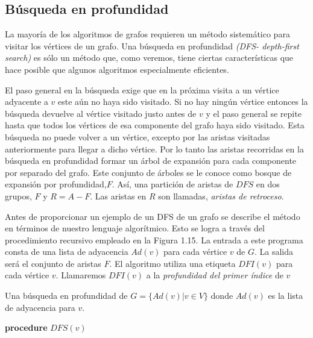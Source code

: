 \documentclass[10pt,a5paper]{book}
\begin{document}
\subsection{Búsqueda en profundidad}
La mayoría de los algoritmos de grafos requieren un método sistemático para visitar los vértices de un grafo. Una búsqueda en profundidad \emph{(DFS- depth-first search)} es sólo un método que, como veremos, tiene ciertas características que hace posible que algunos algoritmos especialmente eficientes.

El paso general en la búsqueda exige que en la próxima visita a un vértice adyacente a $v$ este aún no haya sido visitado. Si no hay ningún vértice entonces la búsqueda devuelve al vértice visitado justo antes de $v$ y el paso general se repite hasta que todos los vértices de esa componente del grafo haya sido visitado. Esta búsqueda no puede volver a un vértice, excepto por las aristas visitadas anteriormente para llegar a dicho vértice. Por lo tanto las aristas recorridas en la búsqueda en profundidad formar un árbol de expansión para cada componente por separado del grafo. Este conjunto de árboles se le conoce como bosque de expansión por profundidad,$F$. Así, una partición de aristas de $DFS$ en dos grupos, $F$ y $R = A - F$. Las aristas en $R$ son llamadas, \emph{aristas de retroceso}.

Antes de proporcionar un ejemplo de un DFS de un grafo se describe el método en términos de nuestro lenguaje algorítmico. Esto se logra a través del procedimiento recursivo empleado en la Figura 1.15. La entrada a este programa consta de una lista de adyacencia $Ad(v)$ para cada vértice $v$ de $G$. La salida será el conjunto de aristas $F$. El algoritmo utiliza una etiqueta $DFI(v)$ para cada vértice $v$. Llamaremos $DFI(v)$ a la \emph{profundidad del primer índice} de $v$
\vfill
\pagebreak
\begin{algorithm}[H]
\caption{Una búsqueda en profundidad de $G = \{Ad(v)|v \in V\}$ donde $Ad(v)$ es la lista de adyacencia para $v$.}
\dontprintsemicolon
\textbf{procedure} $DFS(v)$
\end{algorithm}
\end{document}
